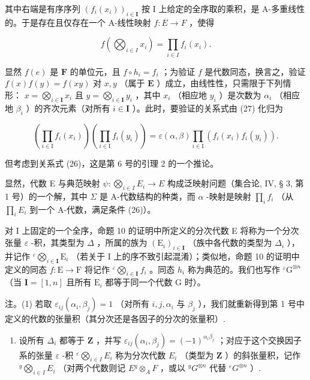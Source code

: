 其中右端是有序序列 \((f_{i}(x_{i}))_{i\in\mathbf{I}}\) 按 I 上给定的全序取的乘积，是 A-多重线性的。于是存在且仅存在一个 A-线性映射 \(f: E \rightarrow F\) ，使得

\[
f \left(\bigotimes_ {i \in I} x _ {i}\right) = \prod_ {i \in I} f _ {i} (x _ {i}).\tag{30}
\]

显然 \(f(e)\) 是 \(\mathbf{F}\) 的单位元，且 \(f \circ h_i = f_i\) ；为验证 \(f\) 是代数同态，换言之，验证 \(f(x)f(y) = f(xy)\) 对 \(x, y\) （属于 \(\mathbf{E}\) ）成立，由线性性，只需限于下列情形： \(x = \bigotimes_{i \in \mathbf{I}} x_i\) 且 \(y = \bigotimes_{i \in \mathbf{I}} y_i\) ，其中 \(x_i\) （相应地 \(y_i\) ）是次数为 \(\alpha_i\) （相应地 \(\beta_i\) ）的齐次元素（对所有 \(i \in \mathbf{I}\) ）。此时，要验证的关系式由 (27) 化归为

\[
\left(\prod_ {i \in \mathrm{I}} f _ {i} (x _ {i})\right) \left(\prod_ {i \in \mathrm{I}} f _ {i} (y _ {i})\right) = \varepsilon (\alpha , \beta) \prod_ {i \in \mathrm{I}} \left(f _ {i} (x _ {i}) f _ {i} (y _ {i})\right).
\]

但考虑到关系式 (26)，这是第 6 号的引理 2 的一个推论。

显然，代数 E 与典范映射 \(\psi: \bigotimes_{i \in I} E_i \to E\) 构成泛映射问题（集合论, IV, § 3, 第 1 号）的一个解，其中 \(\Sigma\) 是 A-代数结构的种类，而 \(\alpha\) -映射是映射 \(\prod_{i} f_i\) （从 \(\prod_{i} E_i\) 到一个 A-代数，满足条件 (26)）。

对 I 上固定的一个全序，命题 10 的证明中所定义的分次代数 E 将称为一个分次张量 \(\varepsilon\) -积，其类型为 \(\Delta\) ，所属的族为 \((\mathrm{E}_i)_{i\in \mathbf{I}}\) （族中各代数的类型为 \(\Delta_i\) ），并记作 \({}^{\varepsilon}\bigotimes_{i\in \mathbf{I}}\mathrm{E}_i\) （若关于 I 上的序不致引起混淆）；类似地，命题 10 的证明中定义的同态 \(f:\mathrm{E}\to \mathrm{F}\) 将记作 \({}^{\varepsilon}\bigotimes_{i\in \mathbf{I}}f_i\) 。同态 \(h_i\) 称为典范的。我们也写作 \({}^{\varepsilon}\mathrm{G}^{\otimes n}\) （当 \(\mathbf{I} = [1,n]\) 且所有 \(\mathrm{E}_i\) 都等于同一个代数 G 时）。

注。(1) 若取 \(\varepsilon_{ij}(\alpha_i, \beta_j) = 1\) （对所有 \(i, j, \alpha_i\) 与 \(\beta_j\) ），我们就重新得到第 1 号中定义的代数的张量积（其分次还是各因子的分次的张量积）.

\begin{enumerate}
\def\labelenumi{(\arabic{enumi})}
\setcounter{enumi}{1}
\tightlist
\item
  设所有 \(\Delta_{i}\) 都等于 \(\mathbf{Z}\) ，并写 \(\varepsilon_{ij}(\alpha_i, \beta_j) = (-1)^{\alpha_i \beta_j}\) ；对应于这个交换因子系的张量 \(\varepsilon\) -积 \({}^{\varepsilon}\bigotimes_{i \in I} E_i\) 称为分次代数 \(E_i\) （类型为 \(\mathbf{Z}\) ）的斜张量积，记作 \({}^{g}\bigotimes_{i \in I} E_i\) （对两个代数则记 \(E{}^{g} \otimes_A F\) ，或以 \({}^{g} G^{\otimes n}\) 代替 \({}^{\varepsilon} G^{\otimes n}\) ）.
\end{enumerate}

